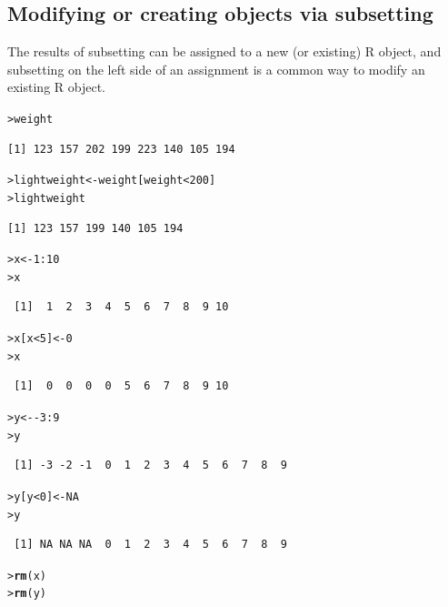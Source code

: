 \documentclass[12pt,oneside]{book}\usepackage[]{graphicx}\usepackage[]{color}
\makeatletter
\newcommand{\hlnum}[1]{\textcolor[rgb]{0.686,0.059,0.569}{#1}}%
\newcommand{\hlopt}[1]{\textcolor[rgb]{0,0,0}{#1}}%
\newcommand{\hlstd}[1]{\textcolor[rgb]{0.345,0.345,0.345}{#1}}%
\newcommand{\hlkwb}[1]{\textcolor[rgb]{0.69,0.353,0.396}{#1}}%
\newcommand{\hlkwd}[1]{\textcolor[rgb]{0.737,0.353,0.396}{\textbf{#1}}}%
\newenvironment{kframe}{%
 \def\at@end@of@kframe{}%
 \ifinner\ifhmode%
  \def\at@end@of@kframe{\end{minipage}}%
  \begin{minipage}{\columnwidth}%
 \fi\fi%
 \def\FrameCommand##1{\hskip\@totalleftmargin \hskip-\fboxsep
 \colorbox{shadecolor}{##1}\hskip-\fboxsep
     \hskip-\linewidth \hskip-\@totalleftmargin \hskip\columnwidth}%
 \MakeFramed {\advance\hsize-\width
   \@totalleftmargin\z@ \linewidth\hsize
   \@setminipage}}%
 {\par\unskip\endMakeFramed%
 \at@end@of@kframe}
\newenvironment{knitrout}{}{} %
\makeatother
\begin{document}
\subsection{Modifying or creating objects via subsetting}
The results of subsetting can be assigned to a new (or existing) R object, and subsetting on the left side of an assignment is a common way to modify an existing R object. 
\begin{knitrout}
\color{fgcolor}\begin{kframe}
\begin{alltt}
\hlstd{> }\hlstd{weight}
\end{alltt}
\begin{verbatim}
[1] 123 157 202 199 223 140 105 194
\end{verbatim}
\begin{alltt}
\hlstd{> }\hlstd{lightweight} \hlkwb{<-} \hlstd{weight[weight} \hlopt{<} \hlnum{200}\hlstd{]}
\hlstd{> }\hlstd{lightweight}
\end{alltt}
\begin{verbatim}
[1] 123 157 199 140 105 194
\end{verbatim}
\begin{alltt}
\hlstd{> }\hlstd{x} \hlkwb{<-} \hlnum{1}\hlopt{:}\hlnum{10}
\hlstd{> }\hlstd{x}
\end{alltt}
\begin{verbatim}
 [1]  1  2  3  4  5  6  7  8  9 10
\end{verbatim}
\begin{alltt}
\hlstd{> }\hlstd{x[x} \hlopt{<} \hlnum{5}\hlstd{]} \hlkwb{<-} \hlnum{0}
\hlstd{> }\hlstd{x}
\end{alltt}
\begin{verbatim}
 [1]  0  0  0  0  5  6  7  8  9 10
\end{verbatim}
\begin{alltt}
\hlstd{> }\hlstd{y} \hlkwb{<-} \hlopt{-}\hlnum{3}\hlopt{:}\hlnum{9}
\hlstd{> }\hlstd{y}
\end{alltt}
\begin{verbatim}
 [1] -3 -2 -1  0  1  2  3  4  5  6  7  8  9
\end{verbatim}
\begin{alltt}
\hlstd{> }\hlstd{y[y} \hlopt{<} \hlnum{0}\hlstd{]} \hlkwb{<-} \hlnum{NA}
\hlstd{> }\hlstd{y}
\end{alltt}
\begin{verbatim}
 [1] NA NA NA  0  1  2  3  4  5  6  7  8  9
\end{verbatim}
\begin{alltt}
\hlstd{> }\hlkwd{rm}\hlstd{(x)}
\hlstd{> }\hlkwd{rm}\hlstd{(y)}
\end{alltt}
\end{kframe}
\end{knitrout}
\end{document}
